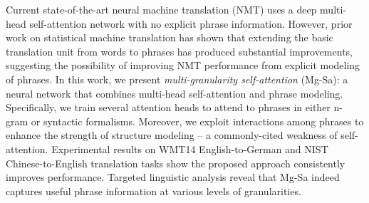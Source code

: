 Current state-of-the-art neural machine translation (NMT) uses a deep multi-head self-attention network with no explicit phrase information. However, prior work on statistical machine translation has shown that extending the basic translation unit from words to phrases has produced substantial improvements, suggesting the possibility of improving NMT performance from explicit modeling of phrases. In this work, we present {\em multi-granularity self-attention} (Mg-Sa): a neural network that combines multi-head self-attention and phrase modeling. Specifically, we train several attention heads to attend to phrases in either n-gram or syntactic formalisms. Moreover, we exploit interactions among phrases to enhance the strength of structure modeling -- a commonly-cited weakness of self-attention.
Experimental results on WMT14 English-to-German and NIST Chinese-to-English translation tasks show the proposed approach consistently improves performance. Targeted linguistic analysis reveal that Mg-Sa indeed captures useful phrase information at various levels of granularities.